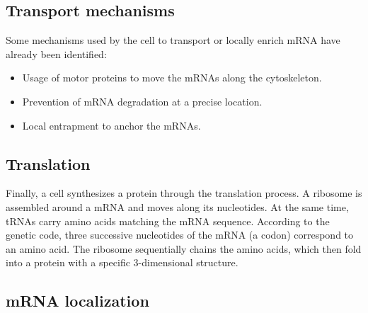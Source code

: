 \subsection{Transport mechanisms}
\label{subsec:intro_transport}

\noindent
Some mechanisms used by the cell to transport or locally enrich \ac{mRNA} have already been identified:
\begin{itemize}
	\item Usage of motor proteins to move the \ac{mRNA}s along the cytoskeleton.
	\item Prevention of \ac{mRNA} degradation at a precise location.
	\item Local entrapment to anchor the \ac{mRNA}s.
\end{itemize}

\subsection{Translation}
\label{subsec:intro_translation}

Finally, a cell synthesizes a protein through the translation process.
A ribosome is assembled around a \ac{mRNA} and moves along its nucleotides.
At the same time, \ac{tRNA}s carry amino acids matching the \ac{mRNA} sequence.
According to the genetic code, three successive nucleotides of the \ac{mRNA} (a codon) correspond to an amino acid.
The ribosome sequentially chains the amino acids, which then fold into a protein with a specific 3-dimensional structure.

\subsection{mRNA localization}
\label{subsec:intro_rna_loc}





